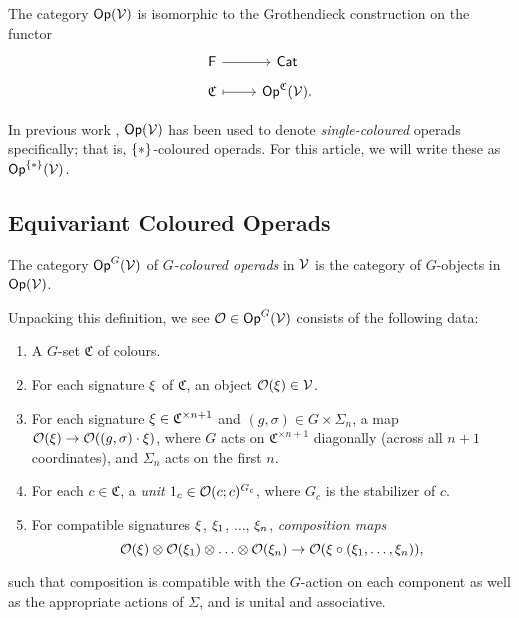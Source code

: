 \documentclass[psamsfonts,onesided,10pt
,draft
]{amsart}%
\begin{document}
\begin{remark}
      The category $\mathsf{Op}(\mathcal V)$ is isomorphic to the Grothendieck construction on the functor
      \begin{equation}
            \begin{tikzcd}[row sep = tiny]
                  \mathsf F \arrow[r] & \mathsf{Cat}
                  \\
                  \mathfrak C \arrow[r, mapsto] & \Op^{\mathfrak C}(\V).
            \end{tikzcd}
      \end{equation}
\end{remark}

\begin{notation}
      In previous work , $\mathsf{Op}(\mathcal V)$ has been used to denote \textit{single-coloured} operads specifically; that is, $\set{\**}$-coloured operads.
      For this article, we will write these as $\Op^{\set{\**}}(\V)$. 
\end{notation}


\subsection{Equivariant Coloured Operads}

\begin{definition}
      The category $\mathsf{Op}^G(\mathcal V)$ of  \textit{$G$-coloured operads} in $\mathcal V$ is the category of
      $G$-objects in $\mathsf{Op}(\mathcal V)$.
\end{definition}


\begin{remark}
      Unpacking this definition, we see $\mathcal{O} \in \mathsf{Op}^G(\mathcal V)$ consists of the following data:
      \begin{enumerate}
      \item A $G$-set $\mathfrak C$ of colours.
      \item For each signature $\xi$ of $\mathfrak C$, an object $\mathcal{O}(\xi) \in \mathcal V$.
      \item For each signature $\xi \in \mathfrak C^{\times n+1}$ and $(g,\sigma) \in G\times \Sigma_n$, a map
            $\mathcal{O}(\xi) \to \mathcal{O}((g,\sigma)\cdot \xi)$,
            where $G$ acts on $\mathfrak C^{\times n+1}$ diagonally (across all $n+1$ coordinates), and $\Sigma_n$ acts on the first $n$.
      \item For each $c \in \mathfrak C$, a \textit{unit} $1_c \in \mathcal{O}(c;c)^{G_c}$, where $G_c$ is the stabilizer of $c$.
      \item For compatible signatures $\xi$, $\xi_1$, $\ldots$, $\xi_n$, \textit{composition maps}
            \begin{equation}
                  \mathcal{O}(\xi) \otimes \mathcal{O}(\xi_1) \otimes \ldots \otimes \mathcal{O}(\xi_n) \to \mathcal{O}(\xi \circ (\xi_1, \ldots, \xi_n)),
            \end{equation}
      \end{enumerate}
      such that composition is
      compatible with the $G$-action on each component as well as the appropriate actions of $\Sigma$,
      and is unital and associative. 
\end{remark}
\end{document}
